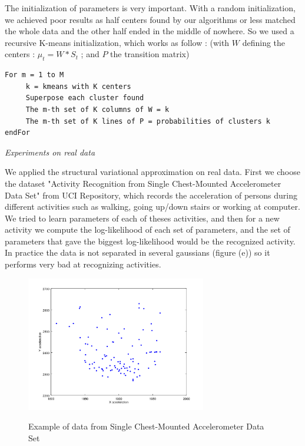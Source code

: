 \documentclass[10pt,a4paper]{report}
\begin{document}
The initialization of parameters is very important. With a random initialization, we achieved poor results as half centers found by our algorithms or less matched the whole data and the other half ended in the middle of nowhere. So we used a recursive K-means initialization, which works as follow : (with $W$ defining the centers : $\mu_t = W*S_t$ ; and $P$ the transition matrix)

\begin{verbatim}
For m = 1 to M
     k = kmeans with K centers
     Superpose each cluster found
     The m-th set of K columns of W = k
     The m-th set of K lines of P = probabilities of clusters k
endFor
\end{verbatim}






\clearpage
\begin{center}
\end{center}
\vspace{80pt}
\begin{center}
\Huge{\textit{Experiments on real data}}
\end{center}
\vspace{20pt}

We applied the structural variational approximation on real data. First we choose the dataset "Activity Recognition from Single Chest-Mounted Accelerometer Data Set" from UCI Repository, which records the acceleration of persons during different activities such as walking, going up/down stairs or working at computer. We tried to learn parameters of each of theses activities, and then for a new activity we compute the log-likelihood of each set of parameters, and the set of parameters that gave the biggest log-likelihood would be the recognized activity. In practice the data is not separated in several gaussians (figure (e)) so it performs very bad at recognizing activities.

\begin{figure}[h]
	\centering
	\includegraphics[width=0.7\textwidth]{standing.png}
	\centerline{\Large{Example of data from Single Chest-Mounted Accelerometer Data Set}}
	\label{fig:e}
\end{figure}
\end{document}
